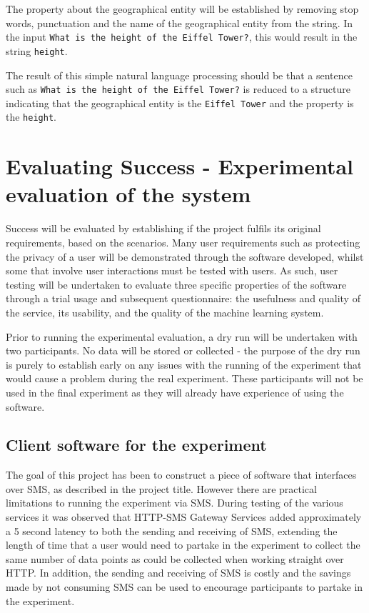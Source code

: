 \documentclass[authoryearcitations]{UoYCSproject}
\begin{document}
The property about the geographical entity will be established by removing stop words, punctuation and the name of the geographical entity from the string.  In the input \texttt{What is the height of the Eiffel Tower?}, this would result in the string \texttt{height}.

The result of this simple natural language processing should be that a sentence such as \texttt{What is the height of the Eiffel Tower?} is reduced to a structure indicating that the geographical entity is the \texttt{Eiffel Tower} and the property is the \texttt{height}.

\section{Evaluating Success - Experimental evaluation of the system}
\label{sec:evaluatingSuccess}
Success will be evaluated by establishing if the project fulfils its original requirements, based on the scenarios.  Many user requirements such as protecting the privacy of a user will be demonstrated through the software developed, whilst some that involve user interactions must be tested with users.  As such, user testing will be undertaken to evaluate three specific properties of the software through a trial usage and subsequent questionnaire: the usefulness and quality of the service, its usability, and the quality of the machine learning system.

Prior to running the experimental evaluation, a dry run will be undertaken with two participants. No data will be stored or collected - the purpose of the dry run is purely to establish early on any issues with the running of the experiment that would cause a problem during the real experiment. These participants will not be used in the final experiment as they will already have experience of using the software.

\subsection{Client software for the experiment}
\label{subsec:clientSoftware}
The goal of this project has been to construct a piece of software that interfaces over SMS, as described in the project title. However there are practical limitations to running the experiment via SMS. During testing of the various services it was observed that HTTP-SMS Gateway Services added approximately a 5 second latency to both the sending and receiving of SMS, extending the length of time that a user would need to partake in the experiment to collect the same number of data points as could be collected when working straight over HTTP. In addition, the sending and receiving of SMS is costly and the savings made by not consuming SMS can be used to encourage participants to partake in the experiment. 
\end{document}

